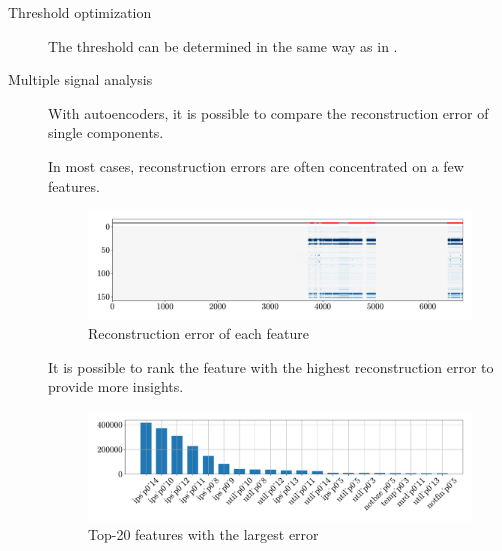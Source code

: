 \begin{description}
    \item[Threshold optimization]
        The threshold can be determined in the same way as in .

    \item[Multiple signal analysis]
        With autoencoders, it is possible to compare the reconstruction error of single components. 

        \begin{remark}
            In most cases, reconstruction errors are often concentrated on a few features.

            \begin{figure}[H]
                \centering
                \includegraphics[width=0.8\linewidth]{./img/_ad_hpc_multi_signal.pdf}
                \caption{Reconstruction error of each feature}
            \end{figure}
        \end{remark}

        \begin{remark}
            It is possible to rank the feature with the highest reconstruction error to provide more insights.

            \begin{figure}[H]
                \centering
                \includegraphics[width=0.8\linewidth]{./img/_ad_hpc_multi_signal_rank.pdf}
                \caption{Top-20 features with the largest error}
            \end{figure}
        \end{remark}
\end{description}



